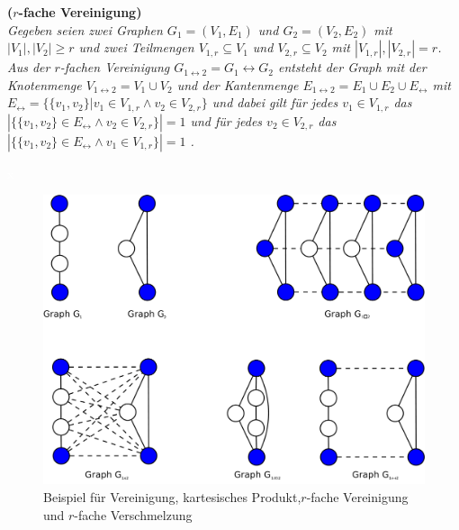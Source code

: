 \begin{defi}{\textbf{($r$-fache Vereinigung)}}\\
\emph{Gegeben seien zwei Graphen $G_1=(V_1,E_1)$ und $G_2=(V_2,E_2)$ mit $|V_1|, |V_2| \geq r$ und zwei Teilmengen $V_{1,r} \subseteq V_1$ und $V_{2,r} \subseteq V_2$ mit $|V_{1,r}|, |V_{2,r}| = r$. 
Aus der $r$-fachen Vereinigung $G_{1 \leftrightarrow 2}= G_1 \leftrightarrow G_2$ entsteht der Graph mit der Knotenmenge $V_{1 \leftrightarrow 2}=V_1 \cup V_2$ und der Kantenmenge $E_{1\leftrightarrow 2}= E_1 \cup E_2 \cup E_{\leftrightarrow }$ mit $E_{\leftrightarrow}=\{\{v_1,v_2\}| v_1 \in V_{1,r} \wedge v_2 \in V_{2,r} \}$ und dabei gilt für jedes $v_1 \in V_{1,r}$ das $|\{\{v_1,v_2\} \in E_{\leftrightarrow} \wedge  v_2 \in V_{2,r} \}|= 1$ und für jedes $v_2 \in V_{2,r}$ das $|\{\{v_1,v_2\} \in E_{\leftrightarrow} \wedge v_1 \in V_{1,r} \}|= 1$ .} 
\end{defi}
\begin{bsp} \textcolor{white}{x}
\begin{figure}[h!]
		\centering 		 
   \includegraphics[width=427pt]{bilder/struktur2.pdf}
	\caption{Beispiel für Vereinigung, kartesisches Produkt,$r$-fache Vereinigung und $r$-fache Verschmelzung}
  	 \end{figure}
\end{bsp}
\newpage
